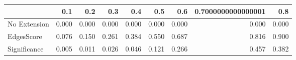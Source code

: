 \begin{tabular}{lrrrrrrrr}
\toprule
{} &   0.1 &   0.2 &   0.3 &   0.4 &   0.5 &   0.6 & 0.7000000000000001 &   0.8 \\
\midrule
No Extension & 0.000 & 0.000 & 0.000 & 0.000 & 0.000 & 0.000 &              0.000 & 0.000 \\
EdgesScore   & 0.076 & 0.150 & 0.261 & 0.384 & 0.550 & 0.687 &              0.816 & 0.900 \\
Significance & 0.005 & 0.011 & 0.026 & 0.046 & 0.121 & 0.266 &              0.457 & 0.382 \\
\bottomrule
\end{tabular}
